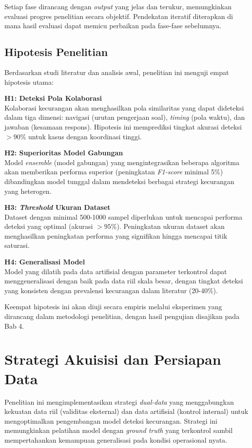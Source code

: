 Setiap fase dirancang dengan \textit{output} yang jelas dan terukur, memungkinkan evaluasi progres penelitian secara objektif. Pendekatan iteratif diterapkan di mana hasil evaluasi dapat memicu perbaikan pada fase-fase sebelumnya.

\subsection{Hipotesis Penelitian}
\label{subsec:hipotesisPenelitian}
Berdasarkan studi literatur dan analisis awal, penelitian ini menguji empat hipotesis utama:

\textbf{H1: Deteksi Pola Kolaborasi}\\
Kolaborasi kecurangan akan menghasilkan pola similaritas yang dapat dideteksi dalam tiga dimensi: navigasi (urutan pengerjaan soal), \textit{timing} (pola waktu), dan jawaban (kesamaan respons). Hipotesis ini memprediksi tingkat akurasi deteksi $>90\%$ untuk kasus dengan koordinasi tinggi.

\textbf{H2: Superioritas Model Gabungan}\\
Model \textit{ensemble} (model gabungan) yang mengintegrasikan beberapa algoritma akan memberikan performa superior (peningkatan \textit{F1-score} minimal 5\%) dibandingkan model tunggal dalam mendeteksi berbagai strategi kecurangan yang heterogen.

\textbf{H3: \textit{Threshold} Ukuran Dataset}\\
Dataset dengan minimal 500-1000 sampel diperlukan untuk mencapai performa deteksi yang optimal (akurasi $>95\%$). Peningkatan ukuran dataset akan menghasilkan peningkatan performa yang signifikan hingga mencapai titik saturasi.

\textbf{H4: Generalisasi Model}\\
Model yang dilatih pada data artifisial dengan parameter terkontrol dapat menggeneralisasi dengan baik pada data riil skala besar, dengan tingkat deteksi yang konsisten dengan prevalensi kecurangan dalam literatur (20-40\%).

Keempat hipotesis ini akan diuji secara empiris melalui eksperimen yang dirancang dalam metodologi penelitian, dengan hasil pengujian disajikan pada Bab 4.

\section{Strategi Akuisisi dan Persiapan Data}
\label{sec:strategiAkuisisiData}
Penelitian ini mengimplementasikan strategi \textit{dual-data} yang menggabungkan kekuatan data riil (validitas eksternal) dan data artifisial (kontrol internal) untuk mengoptimalkan pengembangan model deteksi kecurangan. Strategi ini memungkinkan pelatihan model dengan \textit{ground truth} yang terkontrol sambil mempertahankan kemampuan generalisasi pada kondisi operasional nyata.

